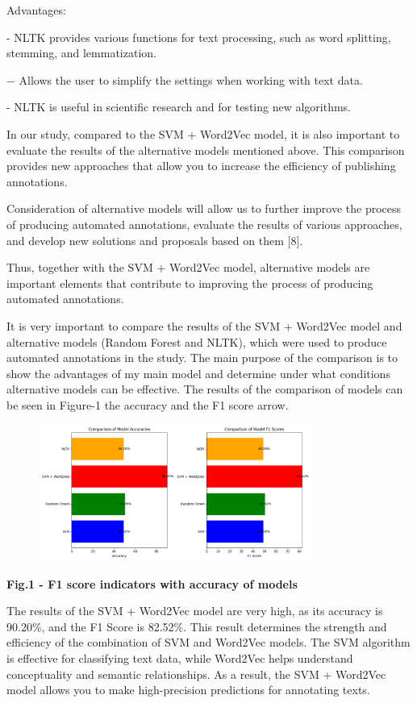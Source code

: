 Advantages:

- NLTK provides various functions for text processing, such as word
splitting, stemming, and lemmatization.

− Allows the user to simplify the settings when working with text data.

- NLTK is useful in scientific research and for testing new algorithms.

In our study, compared to the SVM + Word2Vec model, it is also important
to evaluate the results of the alternative models mentioned above. This
comparison provides new approaches that allow you to increase the
efficiency of publishing annotations.

Consideration of alternative models will allow us to further improve the
process of producing automated annotations, evaluate the results of
various approaches, and develop new solutions and proposals based on
them {[}8{]}.

Thus, together with the SVM + Word2Vec model, alternative models are
important elements that contribute to improving the process of producing
automated annotations.

It is very important to compare the results of the SVM + Word2Vec model
and alternative models (Random Forest and NLTK), which were used to
produce automated annotations in the study. The main purpose of the
comparison is to show the advantages of my main model and determine
under what conditions alternative models can be effective. The results
of the comparison of models can be seen in Figure-1 the accuracy and the
F1 score arrow.

\begin{figure}[H]
	\centering
	\includegraphics[width=0.8\textwidth]{media/ict/image22}
	\caption*{}
\end{figure}


{\bfseries Fig.1 - F1 score indicators with accuracy of models}

The results of the SVM + Word2Vec model are very high, as its accuracy
is 90.20\%, and the F1 Score is 82.52\%. This result determines the
strength and efficiency of the combination of SVM and Word2Vec models.
The SVM algorithm is effective for classifying text data, while Word2Vec
helps understand conceptuality and semantic relationships. As a result,
the SVM + Word2Vec model allows you to make high-precision predictions
for annotating texts.

